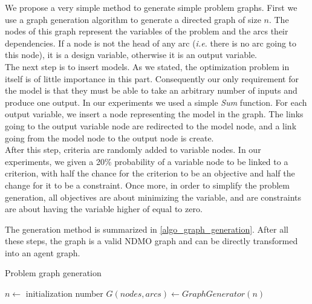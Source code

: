 We propose a very simple method to generate simple problem graphs. First we use a graph generation algorithm to generate a directed graph of size $n$. The nodes of this graph represent the variables of the problem and the arcs their dependencies. If a node is not the head of any arc (\emph{i.e.} there is no arc going to this node), it is a design variable, otherwise it is an output variable.\\
The next step is to insert models. As we stated, the optimization problem in itself is of little importance in this part. Consequently our only requirement for the model is that they must be able to take an arbitrary number of inputs and produce one output. In our experiments we used a simple \emph{Sum} function. For each output variable, we insert a node representing the model in the graph. The links going to the output variable node are redirected to the model node, and a link going from the model node to the output node is create.\\
After this step, criteria are randomly added to variable nodes. In our experiments, we given a 20\% probability of a variable node to be linked to a criterion, with half the chance for the criterion to be an objective and half the change for it to be a constraint. Once more, in order to simplify the problem generation, all objectives are about minimizing the variable, and are constraints are about having the variable higher of equal to zero.

The generation method is summarized in \ref{algo_graph_generation}. After all these steps, the graph is a valid NDMO graph and can be directly transformed into an agent graph.

\begin{algorithm}
\caption{Problem graph generation}
\label{algo_graph_generation}
	$n \leftarrow$ initialization number\;
	$G(nodes, arcs) \leftarrow GraphGenerator(n)$\;
			

\end{algorithm}


